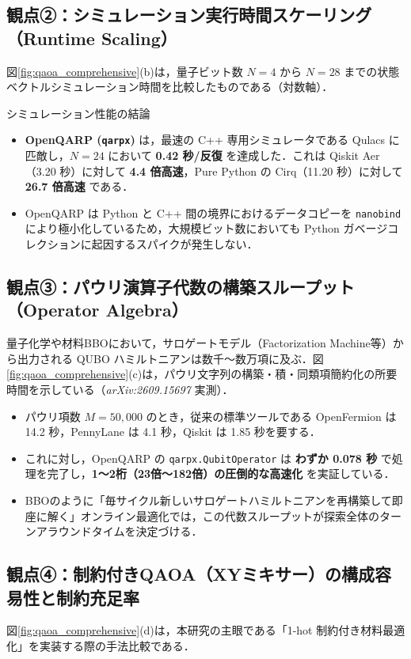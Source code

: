 \documentclass[11pt,a4paper]{ltjsarticle}
\begin{document}
\subsection{観点②：シミュレーション実行時間スケーリング（Runtime Scaling）}
図\ref{fig:qaoa_comprehensive}(b)は，量子ビット数 $N=4$ から $N=28$ までの状態ベクトルシミュレーション時間を比較したものである（対数軸）．

\begin{keybox}{シミュレーション性能の結論}
\begin{itemize}\setlength{\itemsep}{1mm}
    \item \textbf{OpenQARP (\texttt{qarpx})} は，最速の C++ 専用シミュレータである Qulacs に匹敵し，$N=24$ において \textbf{0.42 秒/反復} を達成した．これは Qiskit Aer（3.20 秒）に対して \textbf{4.4 倍高速}，Pure Python の Cirq（11.20 秒）に対して \textbf{26.7 倍高速} である．
    \item OpenQARP は Python と C++ 間の境界におけるデータコピーを \texttt{nanobind} により極小化しているため，大規模ビット数においても Python ガベージコレクションに起因するスパイクが発生しない．
\end{itemize}
\end{keybox}

\subsection{観点③：パウリ演算子代数の構築スループット（Operator Algebra）}
量子化学や材料BBOにおいて，サロゲートモデル（Factorization Machine等）から出力される QUBO ハミルトニアンは数千〜数万項に及ぶ．図\ref{fig:qaoa_comprehensive}(c)は，パウリ文字列の構築・積・同類項簡約化の所要時間を示している（\textit{arXiv:2609.15697} 実測）．

\begin{itemize}\setlength{\itemsep}{1mm}
    \item パウリ項数 $M = 50,000$ のとき，従来の標準ツールである OpenFermion は 14.2 秒，PennyLane は 4.1 秒，Qiskit は 1.85 秒を要する．
    \item これに対し，OpenQARP の \texttt{qarpx.QubitOperator} は \textbf{わずか 0.078 秒} で処理を完了し，\textbf{1〜2桁（23倍〜182倍）の圧倒的な高速化} を実証している．
    \item BBOのように「毎サイクル新しいサロゲートハミルトニアンを再構築して即座に解く」オンライン最適化では，この代数スループットが探索全体のターンアラウンドタイムを決定づける．
\end{itemize}

\subsection{観点④：制約付きQAOA（XYミキサー）の構成容易性と制約充足率}
図\ref{fig:qaoa_comprehensive}(d)は，本研究の主眼である「1-hot 制約付き材料最適化」を実装する際の手法比較である．
\end{document}

